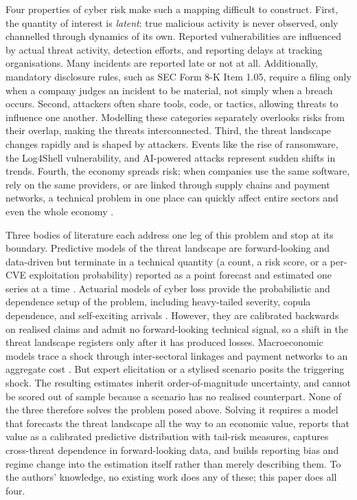 \documentclass[review]{elsarticle}
\begin{document}
Four properties of cyber risk make such a mapping difficult to construct. First, the quantity of interest is \emph{latent}: true malicious activity is never observed, only channelled through dynamics of its own. Reported vulnerabilities are influenced by actual threat activity, detection efforts, and reporting delays at tracking organisations. Many incidents are reported late or not at all. Additionally, mandatory disclosure rules, such as SEC Form 8-K Item 1.05, require a filing only when a company judges an incident to be material, not simply when a breach occurs. Second,  attackers often share tools, code, or tactics, allowing threats to influence one another. Modelling these categories separately overlooks risks from their overlap, making the threats interconnected. Third, the threat landscape changes rapidly and is shaped by attackers. Events like the rise of ransomware, the Log4Shell vulnerability, and AI-powered attacks represent sudden shifts in trends. Fourth, the economy spreads risk; when companies use the same software, rely on the same  providers, or are linked through supply chains and payment networks, a technical problem in one place can quickly affect entire sectors and even the whole economy \citep{esrb2020,eisenbach2022}.

Three bodies of literature each address one leg of this problem and stop at its boundary. Predictive models of the threat landscape are forward-looking and data-driven but terminate in a technical quantity (a count, a risk score, or a per-CVE exploitation probability) reported as a point forecast and estimated one series at a time \citep{kia2024,leverett2020,jacobs2021}. Actuarial models of cyber loss provide the probabilistic and dependence setup of the problem, including heavy-tailed severity, copula dependence, and self-exciting arrivals \citep{eling2019,xu2018,bessyroland2021,awiszus2023}. However, they are calibrated backwards on realised claims and admit no forward-looking technical signal, so a shift in the threat landscape registers only after it has produced losses. Macroeconomic models trace a shock through inter-sectoral linkages and payment networks to an aggregate cost \citep{welburn2022,eling2023,eisenbach2022}. But expert elicitation or a stylised scenario posits the triggering shock. The resulting estimates inherit order-of-magnitude uncertainty, and cannot be scored out of sample because a scenario has no realised counterpart. None of the three therefore solves the problem posed above. Solving it requires a model that forecasts the threat landscape all the way to an economic value, reports that value as a calibrated predictive distribution with tail-risk measures, captures cross-threat dependence in forward-looking data, and builds reporting bias and regime change into the estimation itself rather than merely describing them. To the authors’ knowledge, no existing work does any of these; this paper does all four.
\end{document}
